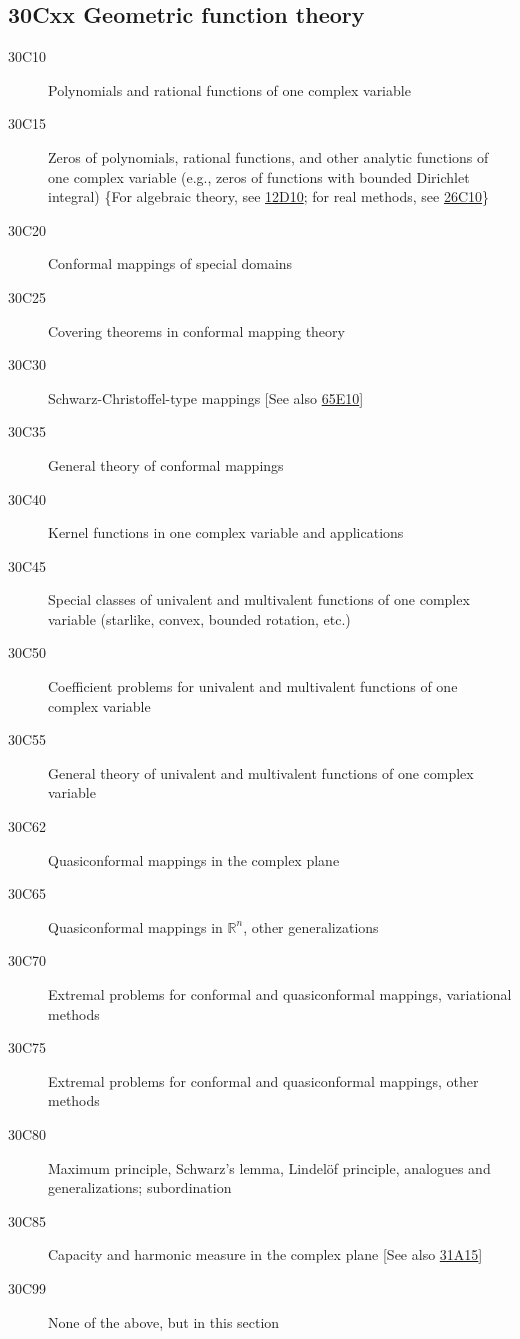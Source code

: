 \subsection*{30Cxx  Geometric function theory }\label{30Cxx}
\begin{description}  
\item [30C10]\label{30C10} Polynomials and rational functions of one complex variable
\item [30C15]\label{30C15} Zeros of polynomials, rational functions, and other analytic functions of one complex variable (e.g., zeros of functions with bounded Dirichlet integral) \{For algebraic theory, see \hyperref[12D10]{12D10}; for real methods, see \hyperref[26C10]{26C10}\}
\item [30C20]\label{30C20} Conformal mappings of special domains 
\item [30C25]\label{30C25} Covering theorems in conformal mapping theory
\item [30C30]\label{30C30} Schwarz-Christoffel-type mappings [See also \hyperref[65E10]{65E10}]
\item [30C35]\label{30C35} General theory of conformal mappings
\item [30C40]\label{30C40} Kernel functions in one complex variable and applications 
\item [30C45]\label{30C45} Special classes of univalent and multivalent functions of one complex variable (starlike, convex, bounded rotation, etc.)
\item [30C50]\label{30C50} Coefficient problems for univalent and multivalent functions of one complex variable
\item [30C55]\label{30C55} General theory of univalent and multivalent functions of one complex variable
\item [30C62]\label{30C62} Quasiconformal mappings in the complex plane
\item [30C65]\label{30C65} Quasiconformal mappings in $\mathbb{R}^n$, other generalizations
\item [30C70]\label{30C70} Extremal problems for conformal and  quasiconformal mappings, variational methods
\item [30C75]\label{30C75} Extremal problems for conformal and quasiconformal mappings, other methods
\item [30C80]\label{30C80} Maximum principle, Schwarz's lemma, Lindel\"{o}f principle, analogues and generalizations; subordination
\item [30C85]\label{30C85} Capacity and harmonic measure in the complex plane [See also \hyperref[31A15]{31A15}]
\item [30C99]\label{30C99} None of the above, but in this section
\end{description}
